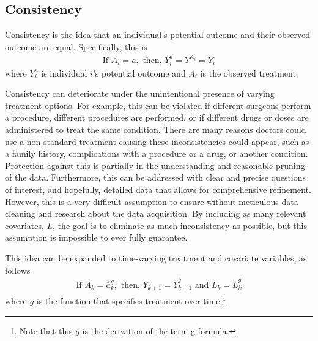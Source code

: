 \subsection{Consistency} 
Consistency is the idea that an individual's potential outcome and their observed outcome are equal\cite{cole2009consistency, hernan_robins_2016}.  Specifically, this is 
\begin{align} 
\text{If  } A_i = a, \text{     then,    } Y_i^a = Y^{A_i} = Y_i 
\end{align} 
where $Y_i^a$ is individual $i$'s potential outcome and $A_i$ is the observed treatment.  

Consistency can deteriorate under the unintentional presence of varying treatment options.  For example, this can be violated if different surgeons perform a procedure, different procedures are performed, or if different drugs or doses are administered to treat the same condition.  There are many reasons doctors could use a non standard treatment causing these inconsistencies could appear, such as a family history, complications with a procedure or a drug, or another condition.  Protection against this is partially in the understanding and reasonable pruning of the data.  Furthermore, this can be addressed with clear and precise questions of interest, and hopefully, detailed data that allows for comprehensive refinement.  However, this is a very difficult assumption to ensure without meticulous data cleaning and research about the data acquisition.  By including as many relevant covariates, $L$, the goal is to eliminate as much inconsistency as possible, but this assumption is impossible to ever fully guarantee.  

This idea can be expanded to time-varying treatment and covariate variables, as follows 
\begin{align} 
\text{If } \overline{A}_k = \bar{a}^g _k, \text{ then, } \overline{Y}_{k+1} =  \bar{Y}^g_{k+1} \text{ and } \overline{L}_k = \bar{L}^g_k
\end{align}
where $g$ is the function that specifies treatment over time.\footnote{Note that this $g$ is the derivation of the term g-formula.}

